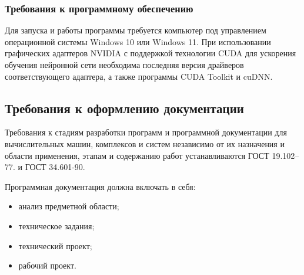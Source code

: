 \subsubsection{Требования к программному обеспечению}

Для запуска и работы программы требуется компьютер под управлением операционной системы Windows 10 или Windows 11. При использовании графических адаптеров NVIDIA с поддержкой технологии CUDA для ускорения обучения нейронной сети необходима последняя версия драйверов соответствующего адаптера, а также программы CUDA Toolkit и cuDNN.

\subsection{Требования к оформлению документации}

Требования к стадиям разработки программ и программной документации для вычислительных машин, комплексов и систем независимо от их назначения и области применения, этапам и содержанию работ устанавливаются ГОСТ 19.102–77. и ГОСТ 34.601-90. 

Программная документация должна включать в себя:

\begin{itemize}
	\item анализ предметной области;
	\item техническое задания;
	\item технический проект;
	\item рабочий проект.
\end{itemize}
